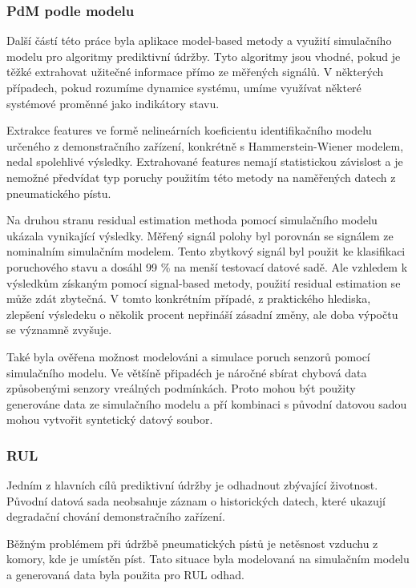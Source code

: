 \subsubsection*{PdM podle modelu}

Další částí této práce byla aplikace model-based metody a využití 
simulačního modelu pro algoritmy prediktivní údržby. Tyto algoritmy
jsou vhodné, pokud je těžké extrahovat užitečné informace přímo ze měřených
signálů. V některých případech, pokud rozumíme
dynamice systému, umíme využívat některé systémové proměnné jako
indikátory stavu.

Extrakce features ve formě nelineárních
koeficientu identifikačního modelu určeného z demonstračního zařízení,
konkrétně s Hammerstein-Wiener modelem, nedal spolehlivé výsledky.
Extrahované features nemají statistickou závislost a je nemožné předvídat typ poruchy
použitím této metody na naměřených datech z pneumatického pístu.

Na druhou stranu residual estimation methoda pomocí simulačního modelu
ukázala vynikající výsledky. Měřený signál polohy byl porovnán se
signálem ze nominalním simulačním modelem. Tento zbytkový
signál byl použit ke klasifikaci poruchového stavu a dosáhl 99 \% na
menší testovací datové sadě. Ale vzhledem k výsledkům získaným pomocí
signal-based metody, použití residual estimation se může zdát zbytečná. V
tomto konkrétním případé, z praktického hlediska, zlepšení
výsledeku o několik procent nepřináší zásadní změny, ale
doba výpočtu se významně zvyšuje.

Také byla ověřena možnost modelováni a simulace poruch senzorů
pomocí simulačního modelu. Ve většíně připadéch je náročné sbírat chybová
data způsobenými senzory vreálných podmínkách. Proto mohou být použity
generováne data ze simulačního modelu a pří kombinaci s původní
datovou sadou mohou vytvořit syntetický datový soubor.

\subsubsection*{RUL}

Jedním z hlavních cílů prediktivní údržby je odhadnout
zbývající životnost. Původní datová sada neobsahuje záznam o
historických datech, které ukazují degradační chování demonstračního
zařízení.

Běžným problémem při údržbě pneumatických pístů je netěsnost
vzduchu z komory, kde je umístěn píst. Tato situace byla
modelovaná na simulačním modelu a generovaná data byla použita pro RUL
odhad.

